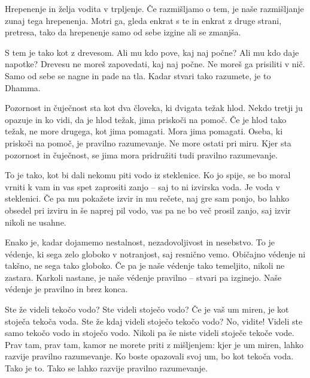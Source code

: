 \clearpage


Hrepenenje in želja vodita v trpljenje. Če razmišljamo o tem, je naše razmišljanje zunaj tega hrepenenja. Motri ga, gleda enkrat s te in enkrat z druge strani, pretresa, tako da hrepenenje samo od sebe izgine ali se zmanjša.

S tem je tako kot z drevesom. Ali mu kdo pove, kaj naj počne? Ali mu kdo daje napotke? Drevesu ne moreš zapovedati, kaj naj počne. Ne moreš ga prisiliti v nič. Samo od sebe se nagne in pade na tla. Kadar stvari tako razumete, je to Dhamma.


Pozornost in čuječnost sta kot dva človeka, ki dvigata težak hlod. Nekdo tretji ju opazuje in ko vidi, da je hlod težak, jima priskoči na pomoč. Če je hlod tako težak, ne more drugega, kot jima pomagati. Mora jima pomagati. Oseba, ki priskoči na pomoč, je pravilno razumevanje. Ne more ostati pri miru. Kjer sta pozornost in čuječnost, se jima mora pridružiti tudi pravilno razumevanje.

\clearpage


To je tako, kot bi dali nekomu piti vodo iz steklenice. Ko jo spije, se bo moral vrniti k vam in vas spet zaprositi zanjo – saj to ni izvirska voda. Je voda v steklenici. Če pa mu pokažete izvir in mu rečete, naj gre sam ponjo, bo lahko obsedel pri izviru in še naprej pil vodo, vas pa ne bo več prosil zanjo, saj izvir nikoli ne usahne.

Enako je, kadar dojamemo nestalnost, nezadovoljivost in nesebstvo. To je védenje, ki sega zelo globoko v notranjost, saj resnično vemo. Običajno védenje ni takšno, ne sega tako globoko. Če pa je naše védenje tako temeljito, nikoli ne zastara. Karkoli nastane, je naše védenje pravilno – stvari pa izginejo. Naše védenje je pravilno in brez konca.

\vspace{-\baselineskip}

Ste že videli tekočo vodo? Ste videli stoječo vodo? Če je vaš um miren, je kot stoječa tekoča voda. Ste že kdaj videli stoječo tekočo vodo? No, vidite! Videli ste samo tekočo vodo in stoječo vodo. Nikoli pa še niste videli stoječe tekoče vode. Prav tam, prav tam, kamor ne morete priti z mišljenjem: kjer je um miren, lahko razvije pravilno razumevanje. Ko boste opazovali svoj um, bo kot tekoča voda. Tako je to. Tako se lahko razvije pravilno razumevanje.

